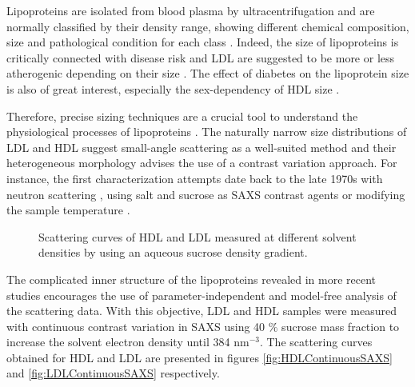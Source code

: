 Lipoproteins are isolated from blood plasma by ultracentrifugation \citep{havel_distribution_1955} and are normally classified by their density range, showing different chemical composition, size and pathological condition for each class \citep{german_lipoproteins:_2006}. Indeed, the size of lipoproteins is critically connected with disease risk \citep{gardner_association_1996} and LDL are suggested to be more or less atherogenic depending on their size \citep{dreon_low-density_1994}. The effect of diabetes on the lipoprotein size is also of great interest, especially the sex-dependency of HDL size \citep{colhoun_lipoprotein_2002}.

Therefore, precise sizing techniques are a crucial tool to understand the physiological processes of lipoproteins \citep{german_lipoproteins:_2006}. The naturally narrow size distributions of LDL and HDL suggest small-angle scattering as a well-suited method and their heterogeneous morphology advises the use of a contrast variation approach. For instance, the first characterization attempts date back to the late 1970s with neutron scattering \citep{stuhrmann_neutron_1975}, using salt \citep{tardieu_structure_1976} and sucrose \citep{muller_structure_1978} as SAXS contrast agents or modifying the sample temperature \citep{laggner_molecular_1977,luzzati_structure_1979}. 

\begin{figure}
	\centering
		\subfloat[HDL]{\resizebox{0.44\linewidth}{!}{\figfont{13pt}}\label{fig:HDLContinuousSAXS}}
		\qquad
		\subfloat[LDL]{\resizebox{0.44\linewidth}{!}{\figfont{13pt}}\label{fig:LDLContinuousSAXS}}
		\caption[Continuous contrast variation experimental data of HDL and LDL.]{Scattering curves of HDL and LDL measured at different solvent densities by using an aqueous sucrose density gradient.}
\end{figure}

The complicated inner structure of the lipoproteins revealed in more recent studies \citep{baumstark_structure_1990,schnitzer_re-evaluation_1994} encourages the use of parameter-independent and model-free analysis of the scattering data. With this objective, LDL and HDL samples were measured with continuous contrast variation in SAXS using 40 $\%$ sucrose mass fraction to increase the solvent electron density until 384 nm$^{-3}$. The scattering curves obtained for HDL and LDL are presented in figures \ref{fig:HDLContinuousSAXS} and \ref{fig:LDLContinuousSAXS} respectively.

